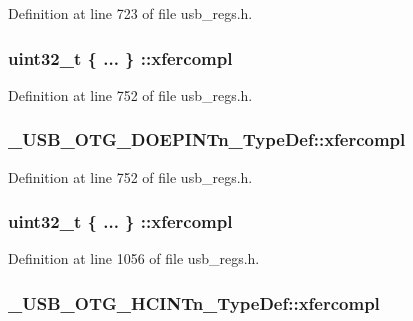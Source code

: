 Definition at line 723 of file usb\-\_\-regs.\-h.

\hypertarget{group___u_s_b___o_t_g___d_r_i_v_e_r_ga5d0d974806b801946b1c20e2ac756d48}{
\subsubsection[{xfercompl}]{\setlength{\rightskip}{0pt plus 5cm}uint32\-\_\-t \{ ... \} \-::xfercompl}}\label{group___u_s_b___o_t_g___d_r_i_v_e_r_ga5d0d974806b801946b1c20e2ac756d48}


Definition at line 752 of file usb\-\_\-regs.\-h.

\hypertarget{group___u_s_b___o_t_g___d_r_i_v_e_r_gaaca4cf95c7b4adf7ca9ec0895ba5360d}{
\subsubsection[{xfercompl}]{ \-\_\-\-U\-S\-B\-\_\-\-O\-T\-G\-\_\-\-D\-O\-E\-P\-I\-N\-Tn\-\_\-\-Type\-Def\-::xfercompl}}\label{group___u_s_b___o_t_g___d_r_i_v_e_r_gaaca4cf95c7b4adf7ca9ec0895ba5360d}


Definition at line 752 of file usb\-\_\-regs.\-h.

\hypertarget{group___u_s_b___o_t_g___d_r_i_v_e_r_gae021e1c800350c250b8eb62151421610}{
\subsubsection[{xfercompl}]{\setlength{\rightskip}{0pt plus 5cm}uint32\-\_\-t \{ ... \} \-::xfercompl}}\label{group___u_s_b___o_t_g___d_r_i_v_e_r_gae021e1c800350c250b8eb62151421610}


Definition at line 1056 of file usb\-\_\-regs.\-h.

\hypertarget{group___u_s_b___o_t_g___d_r_i_v_e_r_ga25454c0ff096c325e8a0871e2d2e3f7e}{
\subsubsection[{xfercompl}]{ \-\_\-\-U\-S\-B\-\_\-\-O\-T\-G\-\_\-\-H\-C\-I\-N\-Tn\-\_\-\-Type\-Def\-::xfercompl}}\label{group___u_s_b___o_t_g___d_r_i_v_e_r_ga25454c0ff096c325e8a0871e2d2e3f7e}


